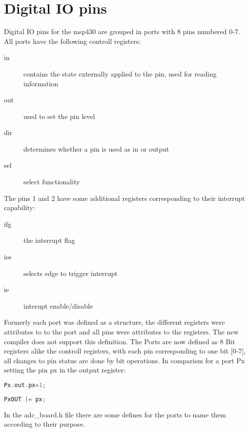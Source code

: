 \section{Digital IO pins}
Digital IO pins for the msp430 are grouped in ports with 8 pins numbered 0-7. All ports have the following controll registers:
\begin{description}
\item [in] contains the state externally applied to the pin, used for reading information
\item [out] used to set the pin level
\item [dir] determines whether a pin is used as in or output
\item [sel] select functionality
\end{description}
The pins 1 and 2 have some additional registers corresponding to their interrupt capability:
\begin{description}
	\item [ifg] the interrupt flag
	\item [ies] selects edge to trigger interrupt
	\item [ie] interupt enable/disable
\end{description}

Formerly each port was defined as a structure, the different registers were attributes to to the port and all pins were attributes to the registers. The new compiler does not support this definition. The Ports are now defined as 8 Bit registers alike the controll registers, with each pin corresponding to one bit [0-7], all changes to pin status are done by bit operations.  In comparism for a port Px setting the pin px in the output register:
\begin{minipage}[t]{0.49\textwidth}
	\begin{lstlisting}[style=cpp,language=C++]
Px.out.px=1;
	\end{lstlisting}
\end{minipage}	
\begin{minipage}[t]{0.49\textwidth}
	\begin{lstlisting}[style=cpp,language=C++]
PxOUT |= px;
	\end{lstlisting}
\end{minipage}
In the adc\_board.h file there are some defines for the ports to name them according to their purpose.
